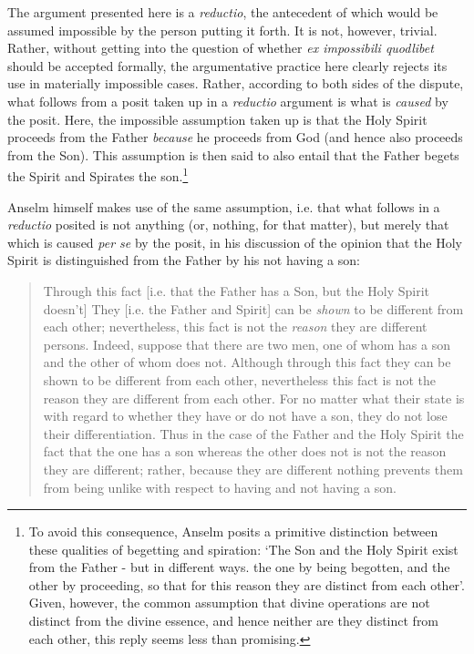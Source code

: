 \documentclass[]{article}
\begin{document}
The argument presented here is a \textit{reductio}, the antecedent of which would be assumed impossible by the person putting it forth. It is not, however, trivial. Rather, without getting into the question of whether \textit{ex impossibili quodlibet} should be accepted formally, the argumentative practice here clearly rejects its use in materially impossible cases. Rather, according to both sides of the dispute, what follows from a posit taken up in a \textit{reductio} argument is what is \textit{caused} by the posit. Here, the impossible assumption taken up is that the Holy Spirit proceeds from the Father \textit{because} he proceeds from God (and hence also proceeds from the Son). This assumption is then said to also entail that the Father begets the Spirit and Spirates the son.\footnote{To avoid this consequence, Anselm posits a primitive distinction between these qualities of begetting and spiration: `The Son and the Holy Spirit exist from the Father - but in different ways. the one by being begotten, and the other by proceeding, so that for this reason they are distinct from each other'.\autocite[474]{AnselmDeProc} Given, however, the common assumption that divine operations are not distinct from the divine essence, and hence neither are they distinct from each other, this reply seems less than promising.} 

Anselm himself makes use of the same assumption, i.e. that what follows in a \textit{reductio} posited is not anything (or, nothing, for that matter), but merely that which is caused \textit{per se} by the posit, in his discussion of the opinion that the Holy Spirit is distinguished from the Father by his not having a son:

\begin{quote}
Through this fact [i.e. that the Father has a Son, but the Holy Spirit doesn't] They [i.e. the Father and Spirit] can be \textit{shown} to be different from each other; nevertheless, this fact is not the \textit{reason} they are different persons. Indeed, suppose that there are two men, one of whom has a son and the other of whom does not. Although through this fact they can be shown to be different from each other, nevertheless this fact is not the reason they are different from each other. For no matter what their state is with regard to whether they have or do not have a son, they do not lose their differentiation. Thus in the case of the Father and the Holy Spirit the fact that the one has a son whereas the other does not is not the reason they are different; rather, because they are different nothing prevents them from being unlike with respect to having and not having a son.\autocite[476]{AnselmDeProc}
\end{quote}
\end{document}
